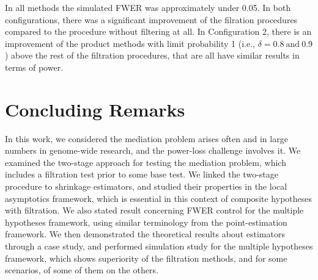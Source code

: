 \documentclass[ejs, twoside]{imsart}
\theoremstyle{plain}
\theoremstyle{remark}
\newcommand{\andtext}{\ \mathrm{and}\ }
\numberwithin{equation}{section}
\numberwithin{table}{section}
\numberwithin{figure}{section}
\begin{document}
In all methods the simulated FWER was approximately under 0.05. In both configurations, there was a significant improvement of the filration procedures compared to the procedure without filtering at all. In Configuration 2, there is an improvement of the product methods with limit probability 1 (i.e., \(\delta = 0.8 \andtext 0.9\)) above the rest of the filtration procedures, that are all have similar results in terms of power.


\section{Concluding Remarks}
In this work, we considered the mediation problem arises often and in large numbers in genome-wide research, and the power-loss challenge involves it. We examined the two-stage approach for testing the mediation problem, which includes a filtration test prior to some base test. We linked the two-stage procedure to shrinkage estimators, and studied their properties in the local asymptotics framework, which is essential in this context of composite hypotheses with filtration. We also stated result concerning FWER control for the multiple hypotheses framework, using similar terminology from the point-estimation framework. We then demonstrated the theoretical results about estimators through a case study, and performed simulation study for the multiple hypotheses framework, which shows superiority of the filtration methods, and for some scenarios, of some of them on the others.





	
\end{document}
